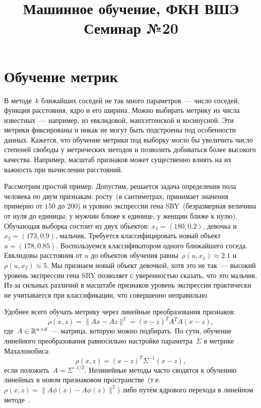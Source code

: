 \documentclass[12pt,fleqn]{article}
\begin{document}
\title{Машинное обучение, ФКН ВШЭ\\Семинар №20}
\author{}
\date{}
\maketitle

\section{Обучение метрик}

В методе~$k$ ближайших соседей не так много параметров~--- число соседей, функция расстояния,
ядро и его ширина.
Можно выбирать метрику из числа известных~--- например, из евклидовой, манхэттенской и косинусной.
Эти метрики фиксированы и никак не могут быть подстроены под особенности данных.
Кажется, что обучение метрики под выборку могло бы увеличить число степеней свободы у метрических методов
и позволить добиваться более высокого качества.
Например, масштаб признаков может существенно влиять на их важность при вычислении расстояний.

Рассмотрим простой пример.
Допустим, решается задача определения пола человека по двум признакам:
росту~(в сантиметрах, принимает значения примерно от $150$ до $200$)
и уровню экспрессии гена SRY~(безразмерная величина от нуля до единицы;
у мужчин ближе к единице, у женщин ближе к нулю).
Обучающая выборка состоит из двух объектов:
$x_1 = (180, 0.2)$, девочка и $x_2 = (173, 0.9)$, мальчик.
Требуется классифицировать новый объект $u = (178, 0.85)$.
Воспользуемся классификатором одного ближайшего соседа.
Евклидовы расстояния от $u$ до объектов обучения равны~$\rho(u, x_1) \approx 2.1$ и $\rho(u, x_2) \approx 5$.
Мы признаем новый объект девочкой, хотя это не так~--- высокий уровень экспрессии гена SRY
позволяет с уверенностью сказать, что это мальчик.
Из-за сильных различий в масштабе признаков уровень экспрессии практически не учитывается
при классификации, что совершенно неправильно.

Удобнее всего обучать метрику через линейные преобразования признаков:
\[
    \rho(x, z)
    =
    \| Ax - Az \|^2
    =
    (x - z)^T A^T A (x - z),
\]
где~$A \in \RR^{n \times d}$~--- матрица, которую можно подбирать.
По сути, обучение линейного преобразования равносильно настройке параметра~$\Sigma$
в метрике Махалонобиса:
\[
    \rho(x, z)
    =
    (x - z)^T \Sigma^{-1} (x - z),
\]
если положить~$A = \Sigma^{-1/2}$.
Нелинейные методы часто сводятся к обучению линейных
в новом признаковом пространстве~(т.е.~$\rho(x, z) = \|A \phi(x) - A \phi(z)\|^2$)
либо путём ядрового перехода в линейном методе~\cite{kulis12survey}.
\end{document}

